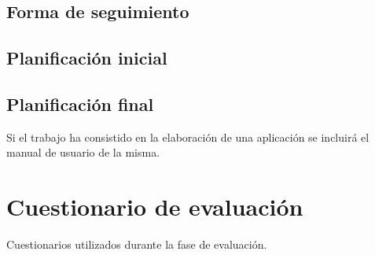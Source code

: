 \documentclass[12pt,a4paper,onecolumn,oneside]{report}
\begin{document}
\section{Forma de seguimiento}

\section{Planificación inicial}

\section{Planificación final}
Si el trabajo ha consistido en la elaboración de una aplicación se incluirá el manual de usuario de la misma.


\chapter{Cuestionario de evaluación}
\label{Cuestionario de evaluación}

Cuestionarios utilizados durante la fase de evaluación.
\end{document}
